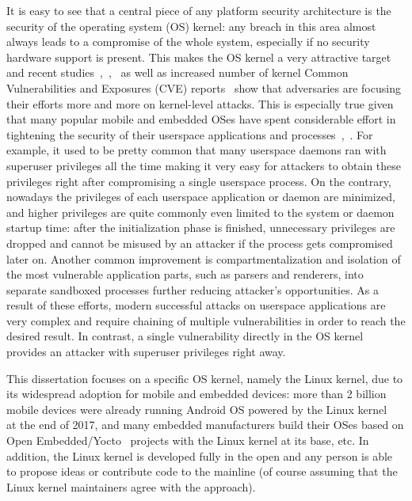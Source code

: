 
It is easy to see that a central piece of any platform security architecture is the security of the operating system (OS) kernel: any breach in this area almost always leads to a compromise of the whole system, especially if no security hardware support is present. This makes the OS kernel a very attractive target and recent studies~\cite{stoep2016android},~\cite{tolvanen2017},~\cite{windowsexploits} as well as increased number of kernel Common Vulnerabilities and Exposures (CVE) reports~\cite{nistCves} show that adversaries are focusing their efforts more and more on kernel-level attacks. This is especially true given that many popular mobile and embedded OSes have spent considerable effort in tightening the security of their userspace applications and processes~\cite{stoep2016android},~\cite{tolvanen2017}. For example, it used to be pretty common that many userspace daemons ran with superuser privileges all the time making it very easy for attackers to obtain these privileges right after compromising a single userspace process. On the contrary, nowadays the privileges of each userspace application or daemon are minimized, and higher privileges are quite commonly even limited to the system or daemon startup time: after the initialization phase is finished, unnecessary privileges are dropped and cannot be misused by an attacker if the process gets compromised later on. Another common improvement is compartmentalization and isolation of the most vulnerable application parts, such as parsers and renderers, into separate sandboxed processes further reducing attacker's opportunities. As a result of these efforts, modern successful attacks on userspace applications are very complex and require chaining of multiple vulnerabilities in order to reach the desired result. In contrast, a single vulnerability directly in the OS kernel provides an attacker with superuser privileges right away.

This dissertation focuses on a specific OS kernel, namely the Linux kernel, due to its widespread adoption for mobile and embedded devices: more than 2 billion mobile devices were already running Android OS powered by the Linux kernel~\cite{googleio2017} at the end of 2017, and many embedded manufacturers build their OSes based on Open Embedded/Yocto~\cite{OE2017, yocto2017} projects with the Linux kernel at its base, etc. 
In addition, the Linux kernel is developed fully in the open and any person is able to propose ideas or contribute code to the mainline (of course assuming that the Linux kernel maintainers agree with the approach).


